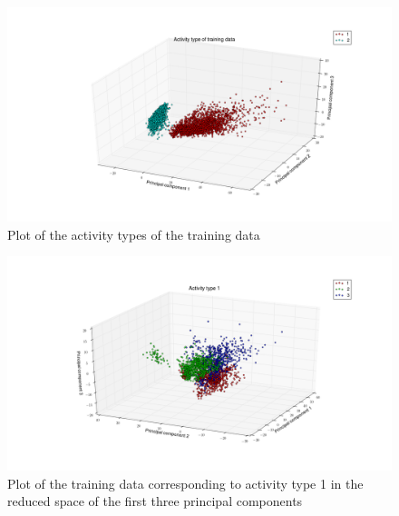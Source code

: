 \documentclass [a4paper] {report}
\begin{document}
	\begin{figure}[H]
		\begin{center}
			\includegraphics[scale=0.35]{Images/Xactivity.png}
			\caption{Plot of the activity types of the training data}
			\label{Xactivity}
		\end{center}
	\end{figure}
	
	\begin{figure}[H]
		\begin{center}
			\includegraphics[scale=0.35]{Images/Xtrn1.png}
			\caption{Plot of the training data corresponding to activity type 1 in the reduced space of the first three principal components}
			\label{Xtrn1}
		\end{center}
	\end{figure}
	
\end{document}
